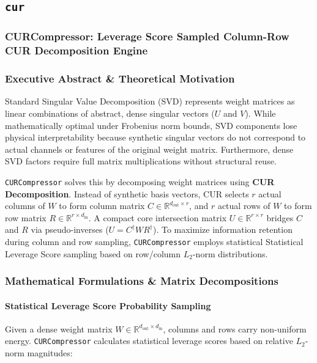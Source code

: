 \subsection{\texttt{cur}}
\subsubsection*{CURCompressor: Leverage Score Sampled Column-Row CUR Decomposition Engine}

\subsubsection*{Executive Abstract \& Theoretical Motivation}
Standard Singular Value Decomposition (SVD) represents weight matrices as linear combinations of abstract, dense singular vectors ($U$ and $V$). While mathematically optimal under Frobenius norm bounds, SVD components lose physical interpretability because synthetic singular vectors do not correspond to actual channels or features of the original weight matrix. Furthermore, dense SVD factors require full matrix multiplications without structural reuse.

\texttt{CURCompressor} solves this by decomposing weight matrices using \textbf{CUR Decomposition}. Instead of synthetic basis vectors, CUR selects $r$ actual columns of $W$ to form column matrix $C \in \mathbb{R}^{d_{\text{out}} \times r}$, and $r$ actual rows of $W$ to form row matrix $R \in \mathbb{R}^{r \times d_{\text{in}}}$. A compact core intersection matrix $U \in \mathbb{R}^{r \times r}$ bridges $C$ and $R$ via pseudo-inverses ($U = C^\dagger W R^\dagger$). To maximize information retention during column and row sampling, \texttt{CURCompressor} employs statistical Statistical Leverage Score sampling based on row/column $L_2$-norm distributions.


\subsubsection*{Mathematical Formulations \& Matrix Decompositions}

\paragraph{Statistical Leverage Score Probability Sampling}
Given a dense weight matrix $W \in \mathbb{R}^{d_{\text{out}} \times d_{\text{in}}}$, columns and rows carry non-uniform energy. \texttt{CURCompressor} calculates statistical leverage scores based on relative $L_2$-norm magnitudes:

